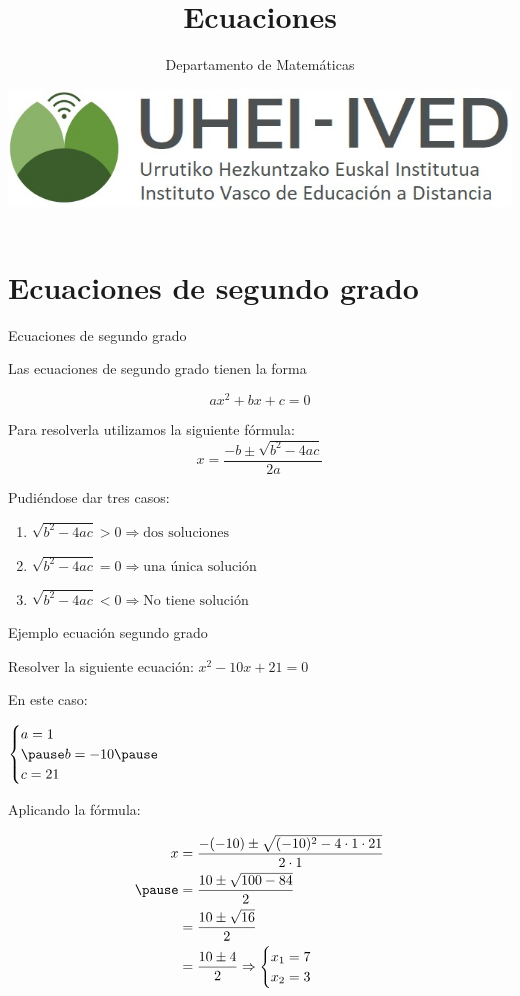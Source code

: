 \documentclass[9pt]{../if-beamer}
\author{Departamento de Matemáticas}
\title{Ecuaciones}
\date{\includegraphics[scale=0.15]{../imagenes/logoa.jpg}}
\begin{document}
\begin{frame}
\titlepage
\end{frame}

\begin{frame}
\tableofcontents
\end{frame}

\section{Ecuaciones de segundo grado}

\begin{frame}{Ecuaciones de segundo grado}



Las ecuaciones de segundo grado tienen la forma 

\[ ax^2+bx+c=0 \]

\pause
Para resolverla utilizamos la siguiente fórmula:
\[x=\dfrac{-b\pm\sqrt{b^2-4ac}}{2a}\]
\pause

Pudiéndose dar tres casos:
\pause

\begin{enumerate}[<+->]
\item $\sqrt{b^2-4ac}>0 \Rightarrow  \mbox{dos soluciones} $
\item $\sqrt{b^2-4ac}=0  \Rightarrow  \mbox{una única solución}$
\item $\sqrt{b^2-4ac}<0  \Rightarrow  \mbox{No tiene solución}$
\end{enumerate}
\end{frame}

\begin{frame}{Ejemplo ecuación segundo grado}
\begin{exampleblock}
Resolver la siguiente ecuación: $x^2-10x+21=0$
\end{exampleblock}

\pause
En este caso:

\pause
$ \begin{cases} a= 1 \\ \pause b= -10 \pause \\ c=21 \end{cases} $

\pause
Aplicando la fórmula:

 \begin{equation*}
 \begin{split}
 x & =  \dfrac{-(-10) \pm \sqrt{(-10)^2 - 4 \cdot 1 \cdot 21 }}{2 \cdot 1}   \\ \pause
 & =  \dfrac{10 \pm \sqrt{100 - 84 }}{2} \\
 & =  \dfrac{10 \pm \sqrt{16}}{2} \\
 & =  \dfrac{10 \pm 4 }{2} \Rightarrow \begin{cases} x_1 = 7 \\ x_2 = 3 \end{cases} \\
 \end{split}
 \end{equation*} 
 
\end{frame}
\end{document}

